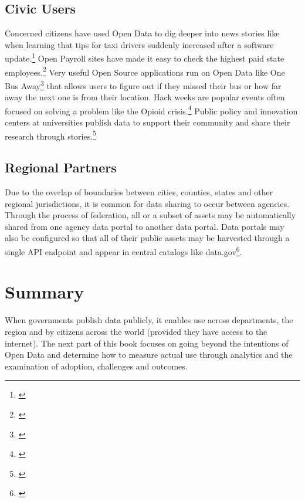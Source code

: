 \documentclass[
  openany]{book}
\begin{document}
\hypertarget{civic-users}{%
\subsection{Civic Users}\label{civic-users}}

Concerned citizens have used Open Data to dig deeper into news stories like when learning that tips for taxi drivers suddenly increased after a software update.\footnote{\citet{iquantny2020}} Open Payroll sites have made it easy to check the highest paid state employees.\footnote{\citet{ctpayroll2019}} Very useful Open Source applications run on Open Data like One Bus Away\footnote{\citet{soundtransitdata}} that allows users to figure out if they missed their bus or how far away the next one is from their location. Hack weeks are popular events often focused on solving a problem like the Opioid crisis.\footnote{\citet{doi:10.1080/14659891.2020.1753833}} Public policy and innovation centers at universities publish data to support their community and share their research through stories.\footnote{\citet{ndsc}}

\hypertarget{regional-partners}{%
\subsection{Regional Partners}\label{regional-partners}}

Due to the overlap of boundaries between cities, counties, states and other regional jurisdictions, it is common for data sharing to occur between agencies. Through the process of federation, all or a subset of assets may be automatically shared from one agency data portal to another data portal. Data portals may also be configured so that all of their public assets may be harvested through a single API endpoint and appear in central catalogs like data.gov\footnote{\citet{datagov}}.

\hypertarget{summary}{%
\section{Summary}\label{summary}}

When governments publish data publicly, it enables use across departments, the region and by citizens across the world (provided they have access to the internet). The next part of this book focuses on going beyond the intentions of Open Data and determine how to measure actual use through analytics and the examination of adoption, challenges and outcomes.
\end{document}
